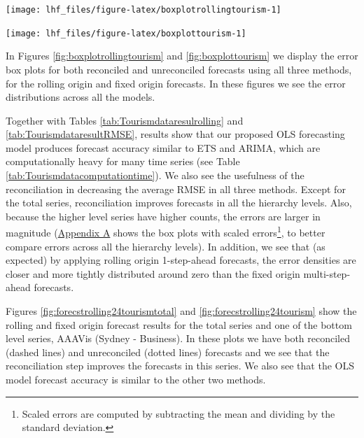 \documentclass[11pt,a4paper,]{article}
\let\origfigure\figure
\let\endorigfigure\endfigure
\renewenvironment{figure}[1][2] {
    \expandafter\origfigure\expandafter[!htbp]
} {
    \endorigfigure
}
\begin{document}
\begin{figure}

{\centering \texttt{[image: lhf\_files/figure-latex/boxplotrollingtourism-1]} 

}

\caption{Box plots of rolling origin forecast errors from reconciled and unreconciled ETS, ARIMA and OLS methods at each hierarchical level for tourism demand.}\label{fig:boxplotrollingtourism}
\end{figure}

\begin{figure}

{\centering \texttt{[image: lhf\_files/figure-latex/boxplottourism-1]} 

}

\caption{Box plots of fixed origin forecast errors for reconciled and unreconciled ETS, ARIMA and OLS methods at each hierarchical level for tourism demand.}\label{fig:boxplottourism}
\end{figure}

In Figures \ref{fig:boxplotrollingtourism} and \ref{fig:boxplottourism} we display the error box plots for both reconciled and unreconciled forecasts using all three methods, for the rolling origin and fixed origin forecasts. In these figures we see the error distributions across all the models.

Together with Tables \ref{tab:Tourismdataresulrolling} and \ref{tab:TourismdataresultRMSE}, results show that our proposed OLS forecasting model produces forecast accuracy similar to ETS and ARIMA, which are computationally heavy for many time series (see Table \ref{tab:Tourismdatacomputationtime}). We also see the usefulness of the reconciliation in decreasing the average RMSE in all three methods. Except for the total series, reconciliation improves forecasts in all the hierarchy levels. Also, because the higher level series have higher counts, the errors are larger in magnitude (\protect\hyperlink{appendixA}{Appendix A} shows the box plots with scaled errors\footnote{Scaled errors are computed by subtracting the mean and dividing by the standard deviation.}, to better compare errors across all the hierarchy levels). In addition, we see that (as expected) by applying rolling origin 1-step-ahead forecasts, the error densities are closer and more tightly distributed around zero than the fixed origin multi-step-ahead forecasts.

Figures \ref{fig:forecstrolling24tourismtotal} and \ref{fig:forecstrolling24tourism} show the rolling and fixed origin forecast results for the total series and one of the bottom level series, AAAVis (Sydney - Business). In these plots we have both reconciled (dashed lines) and unreconciled (dotted lines) forecasts and we see that the reconciliation step improves the forecasts in this series. We also see that the OLS model forecast accuracy is similar to the other two methods.
\end{document}
